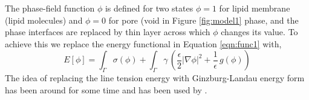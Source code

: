 \documentclass[english,12pt]{article}
\begin{document}
The phase-field function $\phi$ is defined for two states $\phi=1$ for lipid membrane (lipid molecules) and $\phi=0$ for pore (void in Figure \ref{fig:model1} phase, and the phase interfaces are replaced by thin layer across which $\phi$ changes its value. To achieve this we replace the energy functional in Equation \ref{eqn:func1} with,
\begin{equation}
	E\left[\phi\right]=\int_{\Gamma}\sigma\left(\phi\right)+\int_{\Gamma}\gamma\,\left(\frac{\epsilon}{2}|\nabla\phi|^{2}+\frac{1}{\epsilon}\,g\left(\phi\right) \right)
	\label{eqn:func2}
\end{equation}
The idea of replacing the line tension energy with Ginzburg-Landau energy form has been around for some time  and has been used by \cite{lowengrub2009phase}. 
\newpage


\end{document}
